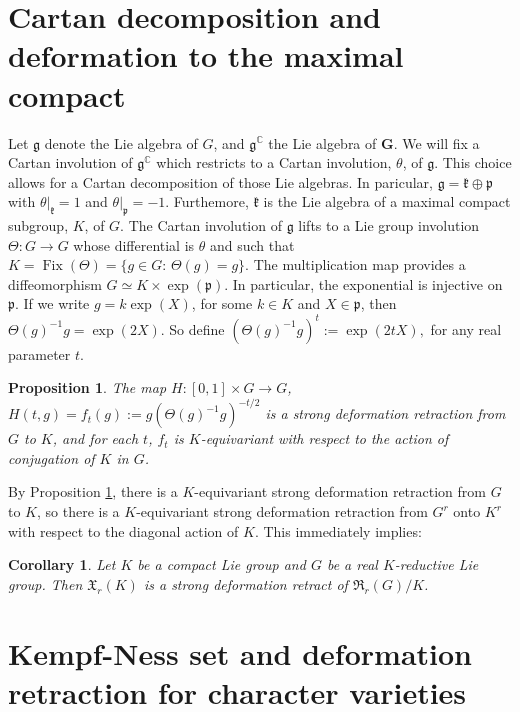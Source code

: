 \documentclass[a4paper,11pt,twoside]{article}
\newcounter{a}
\numberwithin{equation}{section}
\numberwithin{figure}{section}
\theoremstyle{plain}
\theoremstyle{definition}
\theoremstyle{remark}
\theoremstyle{plain}
\theoremstyle{plain}
\newtheorem{prop}[thm]{Proposition}
\theoremstyle{plain}
\newtheorem{cor}[thm]{Corollary}
\begin{document}
\section{Cartan decomposition and deformation to the maximal compact}

\label{sec:polar-dec}
Let ${\mathfrak{g}}$ denote the Lie algebra of $G$, and ${\mathfrak{g}^{\mathbb{C}}}$
the Lie algebra of $\mathbf{G}$. We will fix a Cartan involution of ${\mathfrak{g}^{\mathbb{C}}}$
which restricts to a Cartan involution, $\theta$, of ${\mathfrak{g}}$. This choice allows for a Cartan decomposition of those Lie algebras. In paricular, ${\mathfrak{g}}={\mathfrak{k}}\oplus{\mathfrak{p}}$ with $\theta|_{\mathfrak{k}}=1$ and $\theta|_{\mathfrak{p}}=-1$. Furthemore, ${\mathfrak{k}}$ is the Lie algebra of a maximal compact subgroup, $K$, of $G$. The Cartan involution of ${\mathfrak{g}}$ lifts
to a Lie group involution $
\Theta:G\to G$
 whose differential is $\theta$ and such that $K=\operatorname{Fix}(\Theta)=\{g\in G:\, \Theta(g)=g\}$.
 The multiplication map
 provides a diffeomorphism $G\simeq K\times\exp({\mathfrak{p}})$. In particular, the exponential is injective on ${\mathfrak{p}}$.
 If we write $g=k\exp(X)$, for some $k\in K$ and $X\in{\mathfrak{p}}$, then
$
\Theta(g)^{-1}g=\exp(2X).$
So define $
(\Theta(g)^{-1}g)^{t}:=\exp\left(2tX\right),$
for any real parameter $t$.

\begin{prop}
\label{sdr}The map $H:[0,1]\times G\to G$, $H(t,g)=f_{t}(g):=g(\Theta(g)^{-1}g)^{-t/2}$ is
a strong deformation retraction from $G$ to $K$, and for each $t$,
$f_{t}$ is $K$-equivariant with respect to the action of
conjugation of $K$ in $G$. \end{prop}

By Proposition \ref{sdr}, there is a $K$-equivariant strong deformation
retraction from $G$ to $K$, so there is a $K$-equivariant strong
deformation retraction from $G^{r}$ onto $K^{r}$ with respect to
the diagonal action of $K$. This immediately implies:
\begin{cor}
\label{sdr1} Let $K$ be a compact Lie group and $G$ be a real $K$-reductive
Lie group. Then $\mathfrak{X}_{r}(K)$ is a strong deformation retract
of $\mathfrak{R}_{r}(G)/K$.
\end{cor}

\section{Kempf-Ness set and deformation retraction for character varieties}
\end{document}
